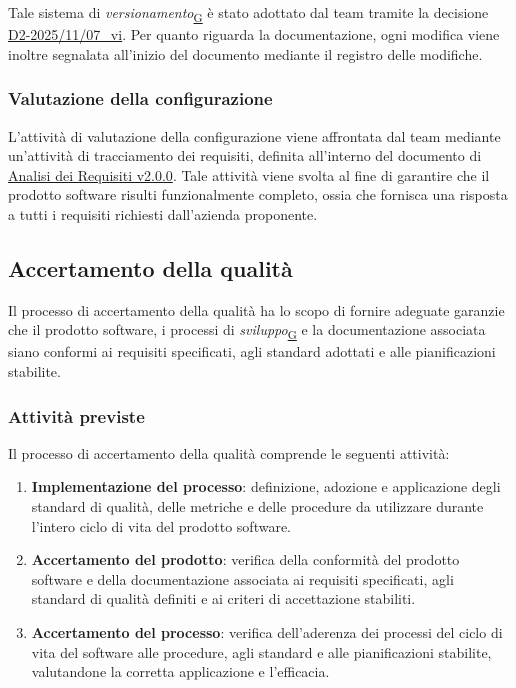 \documentclass[a4paper,12pt]{article}
\begin{document}
            Tale sistema di \textit{versionamento}\textsubscript{\href{https://atlasteam9.github.io/Atlas/glossario.html\#Versionamento}{G}} è stato adottato dal team tramite la decisione \href{https://atlasteam9.github.io/Atlas/docs/RTB/verbali/interni/VI-2025-11-07.pdf}{D2-2025/11/07\_vi}.
            Per quanto riguarda la documentazione, ogni modifica viene inoltre segnalata all'inizio del documento mediante il registro delle modifiche.
        

        \subsubsection{Valutazione della configurazione}
            L'attività di valutazione della configurazione viene affrontata dal team mediante un'attività di tracciamento dei requisiti, definita all'interno del documento di
            \href{https://atlasteam9.github.io/Atlas/docs/PB/documenti/esterni/Analisi%20dei%20Requisiti.pdf}{Analisi dei Requisiti v2.0.0}.
            Tale attività viene svolta al fine di garantire che il prodotto software risulti funzionalmente completo, ossia che fornisca una risposta a tutti i requisiti richiesti dall'azienda proponente.
        
        
    \subsection{Accertamento della qualità}
        Il processo di accertamento della qualità ha lo scopo di fornire adeguate garanzie che il prodotto software, i processi di \textit{sviluppo}\textsubscript{\href{https://atlasteam9.github.io/Atlas/glossario.html\#Sviluppo}{G}} e la documentazione associata siano conformi ai requisiti specificati, agli standard adottati e alle pianificazioni stabilite.

        \subsubsection{Attività previste}
            Il processo di accertamento della qualità comprende le seguenti attività:
            \begin{enumerate}
                \item \textbf{Implementazione del processo}: definizione, adozione e applicazione degli standard di qualità, delle metriche e delle procedure da utilizzare durante l'intero ciclo di vita del prodotto software.
                \item \textbf{Accertamento del prodotto}: verifica della conformità del prodotto software e della documentazione associata ai requisiti specificati, agli standard di qualità definiti e ai criteri di accettazione stabiliti.
                \item \textbf{Accertamento del processo}: verifica dell'aderenza dei processi del ciclo di vita del software alle procedure, agli standard e alle pianificazioni stabilite, valutandone la corretta applicazione e l'efficacia.
            \end{enumerate}    
        
\end{document}
